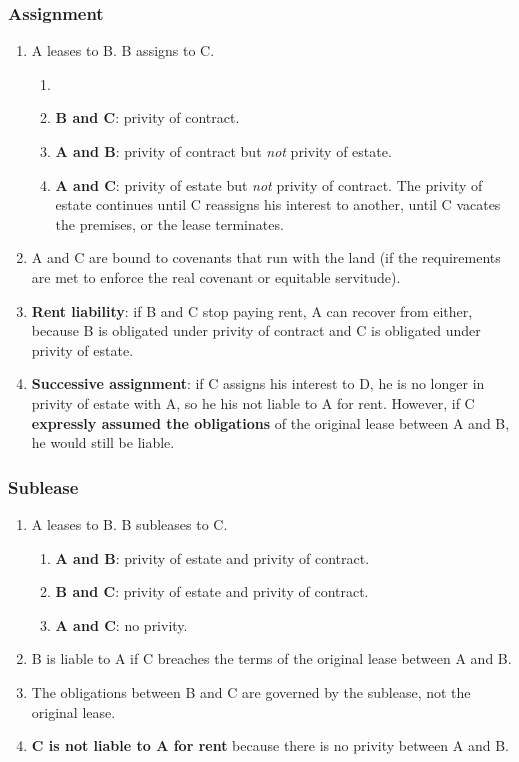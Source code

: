 \subsubsection{Assignment}

\begin{enumerate}
    \item A leases to B. B assigns to C.
    \begin{enumerate}
        \item 
        \item \textbf{B and C}: privity of contract. 
        \item \textbf{A and B}: privity of contract but \emph{not} 
        privity of estate.
        \item \textbf{A and C}: privity of estate but \emph{not} privity of 
        contract. The privity of estate continues until C reassigns his 
        interest to another, until C vacates the premises, or the lease 
        terminates.
    \end{enumerate}
    \item A and C are bound to covenants that run with the land (if the 
    requirements are met to enforce the real covenant or equitable servitude).
    \item \textbf{Rent liability}: if B and C stop paying rent, A can recover 
    from either, because B is obligated under privity of contract and C is 
    obligated under privity of estate.
    \item \textbf{Successive assignment}: if C assigns his interest to D, he 
    is no longer in privity of estate with A, so he his not liable to A for 
    rent. However, if C \textbf{expressly assumed the obligations} of the 
    original lease between A and B, he would still be liable.
\end{enumerate}

\subsubsection{Sublease}

\begin{enumerate}
    \item A leases to B. B subleases to C.
    \begin{enumerate}
        \item \textbf{A and B}: privity of estate and privity of contract.
        \item \textbf{B and C}: privity of estate and privity of contract.
        \item \textbf{A and C}: no privity.
    \end{enumerate}
    \item B is liable to A if C breaches the terms of the original lease 
    between A and B.
    \item The obligations between B and C are governed by the sublease, not 
    the original lease.
    \item \textbf{C is not liable to A for rent} because there is no privity 
    between A and B.
\end{enumerate}

